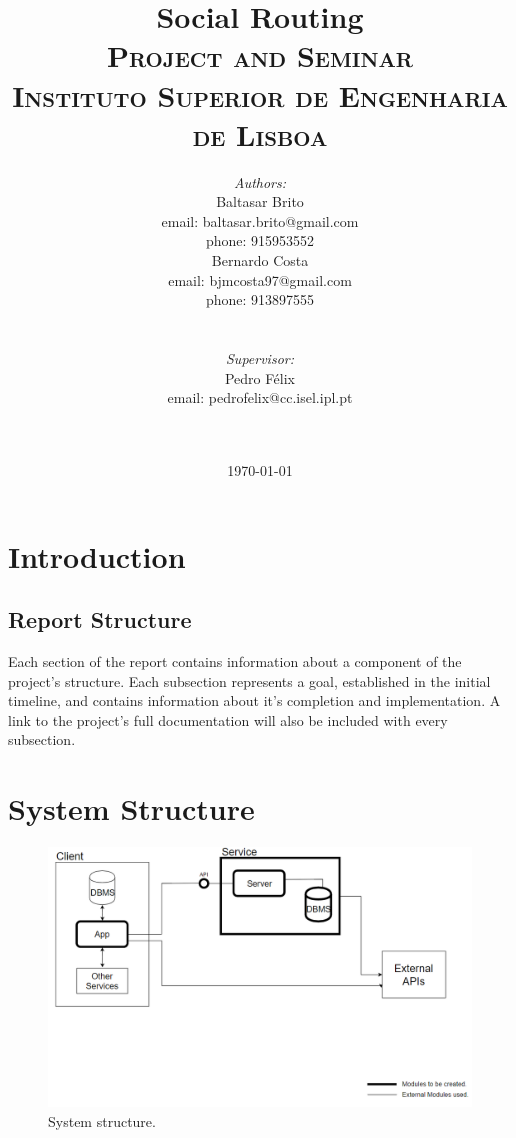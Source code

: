 \documentclass{article}
\title{
    \vspace{-4.0cm}
    {\Huge Social Routing}\\[0.5cm]    
    \textsc{\Large Project and Seminar}\\[0.5cm]
    \textsc{\large Instituto Superior de Engenharia de Lisboa}\\[0.5cm]
}
\date{\today}
\author{   
    \begin{minipage}{0.4\textwidth}
        \begin{flushleft} \large
        \emph{Authors:}\\
        Baltasar Brito\\
        {\small email: baltasar.brito@gmail.com}\\
        {\small phone: 915953552}\\
        Bernardo Costa\\
        {\small email: bjmcosta97@gmail.com}\\
        {\small phone: 913897555}\\
        \end{flushleft}
    \end{minipage}
    ~
    \begin{minipage}{0.4\textwidth}
        \begin{flushright} \large
        \emph{Supervisor:} \\ 
        Pedro Félix\\
        {\small email: pedrofelix@cc.isel.ipl.pt}\\  
        \end{flushright}
    \end{minipage}\\[2cm]  
}
\begin{document}
     
    
    \maketitle

    \newpage

    \tableofcontents

    \newpage

    \section{Introduction}
    
        \subsection{Report Structure}
        Each section of the report contains information about a component of the project's structure. 
        Each subsection represents a goal, established in the initial timeline, and contains information about it's completion and implementation. A link to the project's full documentation will also be included with every subsection.
        
    \newpage
    
    \section{System Structure}

    \begin{figure}[h]            
        \includegraphics[width=\textwidth]{images/project-structure/system-structure.PNG}
        \caption{System structure.}
    \end{figure}  
\end{document}

